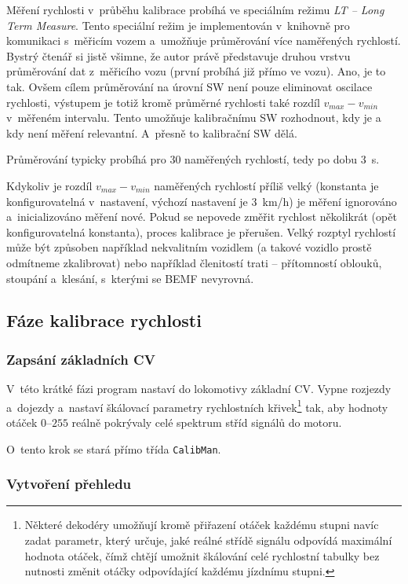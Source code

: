 Měření rychlosti v~průběhu kalibrace probíhá ve speciálním režimu \textit{LT --
Long Term Measure}. Tento speciální režim je implementován v~knihov\-ně pro komunikaci
s~měřicím vozem a~umožňuje průměrování více naměřených rychlostí. Bystrý čtenář si
jistě všimne, že autor právě představuje druhou vrstvu průměrování dat
z~měřicího vozu (první probíhá již přímo ve vozu). Ano, je to tak. Ovšem cílem
průměrování na úrovní SW není pouze eliminovat oscilace rychlosti, výstupem
je totiž kromě průměrné rychlosti také rozdíl $v_{max} - v_{min}$ v~měřeném
intervalu. Tento  umožňuje kalibračnímu SW rozhodnout, kdy
je a kdy není měření relevantní. A~přesně to kalibrační SW dělá.

Průměrování typicky probíhá pro $30$ naměřených rychlostí, tedy po dobu $3$~s.

Kdykoliv je rozdíl $v_{max} - v_{min}$ naměřených rychlostí příliš velký
(konstanta je konfigurovatelná v~nastavení, výchozí nastavení je $3$~km/h) je
měření ignorováno a~inicializováno měření nové. Pokud se nepovede změřit
rychlost několikrát (opět konfigurovatelná konstanta), proces kalibrace je
přerušen. Velký rozptyl rychlostí může být způsoben například nekvalitním
vozidlem (a takové vozidlo prostě odmítneme zkalibrovat) nebo například
členitostí trati -- přítomností oblouků, stoupání a~klesání, s~kterými se BEMF
nevyrovná.

\subsection{Fáze kalibrace rychlosti}

\subsubsection{Zapsání základních CV}

V~této krátké fázi program nastaví do lokomotivy základní CV. Vypne rozjezdy
a~dojezdy a~nastaví škálovací parametry rychlostních křivek\footnote{Některé
dekodéry umožňují kromě přiřazení otáček každému stupni navíc zadat parametr,
který určuje, jaké reálné střídě signálu odpovídá maximální hodnota otáček,
čímž chtějí umožnit škálování celé rychlostní tabulky bez nutnosti změnit otáčky
odpovídající každému jízdnímu stupni.} tak, aby hodnoty otáček $0$--$255$
reálně pokrývaly celé spektrum stříd signálů do motoru.

O~tento krok se stará přímo třída \texttt{CalibMan}.

\subsubsection{Vytvoření přehledu}


